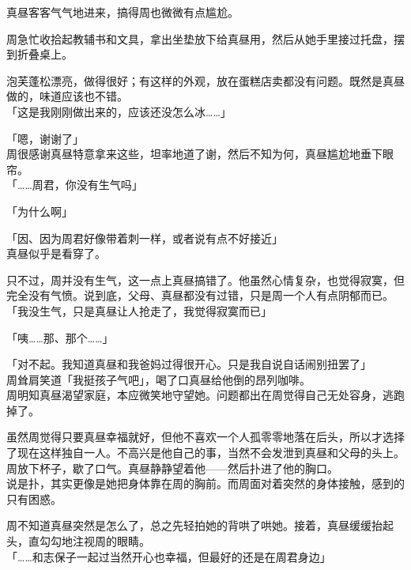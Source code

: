 真昼客客气气地进来，搞得周也微微有点尴尬。

周急忙收拾起教辅书和文具，拿出坐垫放下给真昼用，然后从她手里接过托盘，摆到折叠桌上。

泡芙蓬松漂亮，做得很好；有这样的外观，放在蛋糕店卖都没有问题。既然是真昼做的，味道应该也不错。\\

「这是我刚刚做出来的，应该还没怎么冰……」

「嗯，谢谢了」\\

周很感谢真昼特意拿来这些，坦率地道了谢，然后不知为何，真昼尴尬地垂下眼帘。\\

「……周君，你没有生气吗」

「为什么啊」

「因、因为周君好像带着刺一样，或者说有点不好接近」\\

真昼似乎是看穿了。

只不过，周并没有生气，这一点上真昼搞错了。他虽然心情复杂，也觉得寂寞，但完全没有气愤。说到底，父母、真昼都没有过错，只是周一个人有点阴郁而已。\\

「我没生气，只是真昼让人抢走了，我觉得寂寞而已」

「咦……那、那个……」

「对不起。我知道真昼和我爸妈过得很开心。只是我自说自话闹别扭罢了」\\

周耸肩笑道「我挺孩子气吧」，喝了口真昼给他倒的昂列咖啡。\\

周明知真昼渴望家庭，本应微笑地守望她。问题都出在周觉得自己无处容身，逃跑掉了。

虽然周觉得只要真昼幸福就好，但他不喜欢一个人孤零零地落在后头，所以才选择了现在这样独自一人。不高兴是他自己的事，当然不会发泄到真昼和父母的头上。\\

周放下杯子，歇了口气。真昼静静望着他——然后扑进了他的胸口。\\

说是扑，其实更像是她把身体靠在周的胸前。而周面对着突然的身体接触，感到的只有困惑。

周不知道真昼突然是怎么了，总之先轻拍她的背哄了哄她。接着，真昼缓缓抬起头，直勾勾地注视周的眼睛。\\

「……和志保子一起过当然开心也幸福，但最好的还是在周君身边」\\

